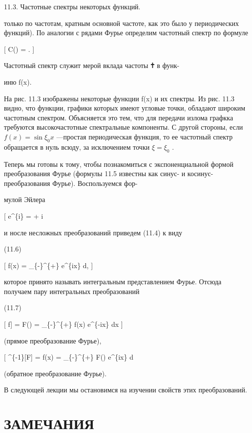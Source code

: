 \documentclass[
  ukrainian,
]{article}
\begin{document}
11.3. Частотные спектры некоторых функций.

только по частотам, кратным основной частоте, как это было у
периодических функций). По аналогии с рядами Фурье определим частотный
спектр по формуле

{[} C(\xi) = . {]}

Частотный спектр служит мерой вклада частоты 🕇 в функ-

иню f(x).

На рис. 11.3 изображены некоторые функции f(x) и их спектры. Из рис.
11.3 видно, что функции, графики которых имеют угловые точки, обладают
широким частотным спектром. Объясняется это тем, что для передачи излома
графкка требуются высокочастотные спектральные компоненты. С другой
стороны, если \(f(x) = \sin \xi_0 x\) ---простая периодическая функция,
то ее частотный спектр обращается в нуль всюду, за исключением точки
\(\xi = \xi_0\) .

Теперь мы готовы к тому, чтобы познакомиться с экспоненциальной формой
преобразования Фурье (формулы 11.5 известны как синус- и
косинус-преобразования Фурье). Воспользуемся фор-

мулой Эйлера

{[} e\^{}\{i\theta\} = \cos \theta + i \sin \theta {]}

и носле несложных преобразований приведем (11.4) к виду

(11.6)

{[} f(x) =  \int\_\{-\infty\}\^{}\{+\infty\}
 e\^{}\{i\xi x\}
d\xi, {]}

которое принято называть интегральным представлением Фурье. Отсюда
получаем пару интегральных преобразований

(11.7)

{[} \mathcal{F}{[}f{]} = F(\xi) = 
\int\_\{-\infty\}\^{}\{+\infty\} f(x) e\^{}\{-i\xi x\} dx {]}

(прямое преобразование Фурье),

{[} \^{}\{-1\}{[}F{]} = f(x) = 
\int\_\{-\infty\}\^{}\{+\infty\} F(\xi) e\^{}\{i\xi x\} d\xi {]}

(обратное преобразование Фурье).

В следующей лекции мы остановимся на изучении свойств этих
преобразований.

\section{ЗАМЕЧАНИЯ}\label{ux437ux430ux43cux435ux447ux430ux43dux438ux44f}
\end{document}
